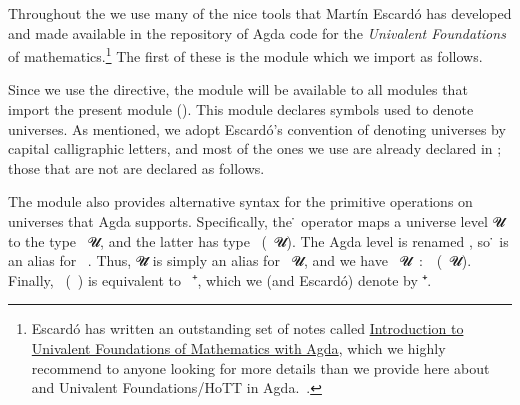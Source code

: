 Throughout the \agdaualib we use many of the nice tools that Martín Escardó has developed and made available in the \typetopology
repository of Agda code for the \emph{Univalent Foundations} of mathematics.\footnote{%
Escardó has written an outstanding set of notes called
\href{https://www.cs.bham.ac.uk/~mhe/HoTT-UF-in-Agda-Lecture-Notes/index.html}{Introduction to Univalent Foundations of Mathematics with Agda}, which we highly recommend to anyone looking for more details than we provide
here about \mltt and Univalent Foundations/HoTT in Agda.~\cite{MHE}.}
The first of these is the  module which we import as follows.
\ccpad
\begin{code}%
\>[0]\AgdaSpace{}%
\AgdaSpace{}%
\AgdaSpace{}%
\<%
\end{code}
\ccpad
Since we use the  directive, the  module will be available to all modules that import
the present module (). This module declares symbols used to denote universes. As mentioned, we adopt Escardó's convention of denoting universes by capital calligraphic letters, and most of the ones we use are already declared in ; those that are not are declared as follows.
\ccpad
\begin{code}%
\>[0]\AgdaSpace{}%
\AgdaSpace{}%
\AgdaSpace{}%
\AgdaSpace{}%
\AgdaSpace{}%
\AgdaSymbol{:}\AgdaSpace{}%
\<%
\end{code}
\scpad

The  module also provides alternative syntax for the primitive operations on universes that Agda supports. Specifically, the \af ̇ operator maps a universe level \ab 𝓤 to the type ~\ab 𝓤, and the latter has type ~(~\ab 𝓤). The Agda level  is renamed , so \af ̇ is an alias for ~. Thus, \ab 𝓤\af ̇ is simply an alias for ~\ab 𝓤, and we have ~\ab 𝓤~\as :~~(~\ab 𝓤). Finally, ~(~) is equivalent to ~\af ⁺, which we (and Escardó) denote by \af ⁺\af ̇.



